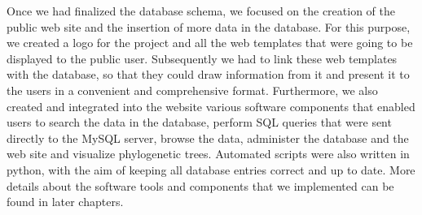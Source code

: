Once we had finalized the database schema, we focused on the creation of the public web site and the insertion of more data in the database.
For this purpose, we created a logo for the project and all the web templates that were going to be displayed to the public user.
Subsequently we had to link these web templates with the database, so that they could draw information from it and present it to the users in a convenient and comprehensive format.
Furthermore, we also created and integrated into the website various software components that enabled users to search the data in the database, perform SQL queries that were sent directly to the MySQL server, browse the data, administer the database and the web site and visualize phylogenetic trees.
Automated scripts were also written in python, with the aim of keeping all database entries correct and up to date.
More details about the software tools and components that we implemented can be found in later chapters.


